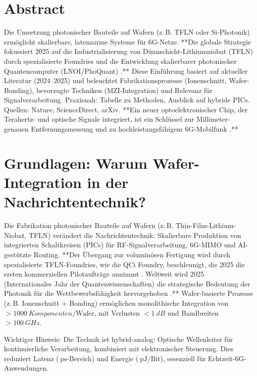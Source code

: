 \section*{Abstract}
		Die Umsetzung photonischer Bauteile auf Wafern (z.\,B. TFLN oder Si-Photonik) ermöglicht skalierbare, latenzarme Systeme für 6G-Netze. **Die globale Strategie fokussiert 2025 auf die Industrialisierung von Dünnschicht-Lithiumniobat (TFLN) durch spezialisierte Foundries \cite{tfln_foundry} und die Entwicklung skalierbarer photonischer Quantencomputer (LNOI/PhoQuant) \cite{phoquant}.** Diese Einführung basiert auf aktueller Literatur (2024–2025) und beleuchtet Fabrikationsprozesse (Ionenschnitt, Wafer-Bonding), bevorzugte Techniken (MZI-Integration) und Relevanz für Signalverarbeitung. Praxisnah: Tabelle zu Methoden, Ausblick auf hybride PICs. Quellen: Nature, ScienceDirect, arXiv. **Ein neuer optoelektronischer Chip, der Terahertz- und optische Signale integriert, ist ein Schlüssel zur Millimeter-genauen Entfernungsmessung und zu hochleistungsfähigem 6G-Mobilfunk \cite{thz_epfl}.**

	
	
	\section{Grundlagen: Warum Wafer-Integration in der Nachrichtentechnik?}
	
	Die Fabrikation photonischer Bauteile auf Wafern (z.\,B. Thin-Film-Lithium-Niobat, TFLN) verändert die Nachrichtentechnik: Skalierbare Produktion von integrierten Schaltkreisen (PICs) für RF-Signalverarbeitung, 6G-MIMO und AI-gestützte Routing. **Der Übergang zur voluminösen Fertigung wird durch spezialisierte TFLN-Foundries, wie die QCi Foundry, beschleunigt, die 2025 die ersten kommerziellen Pilotaufträge annimmt \cite{tfln_foundry}. Weltweit wird 2025 (Internationales Jahr der Quantenwissenschaften) die strategische Bedeutung der Photonik für die Wettbewerbsfähigkeit hervorgehoben \cite{quantenjahr25}.** Wafer-basierte Prozesse (z.\,B. Ionenschnitt + Bonding) ermöglichen monolithische Integration von $>\SI{1000}{Komponenten}/\text{Wafer}$, mit Verlusten $<\SI{1}{dB}$ und Bandbreiten $>\SI{100}{GHz}$.
	\begin{important}
		Wichtiger Hinweis: Die Technik ist hybrid-analog: Optische Wellenleiter für kontinuierliche Verarbeitung, kombiniert mit elektronischer Steuerung. Dies reduziert Latenz ($\SI{}{\pico\second}$-Bereich) und Energie ($\SI{}{\pico\joule}/\text{Bit}$), essenziell für Echtzeit-6G-Anwendungen.
	\end{important}
	
